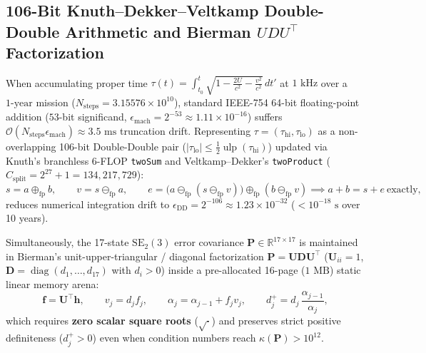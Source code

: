 \documentclass[11pt,a4paper]{article}
\theoremstyle{plain}
\theoremstyle{definition}
\theoremstyle{remark}
\begin{document}
\subsection{106-Bit Knuth--Dekker--Veltkamp Double-Double Arithmetic and Bierman $UDU^\top$ Factorization}

When accumulating proper time $\tau(t) = \int_{t_0}^t \sqrt{1 - \frac{2U}{c^2} - \frac{v^2}{c^2}}\,dt'$ at $1\text{ kHz}$ over a $1\text{-year}$ mission ($N_{\text{steps}} = 3.15576\times 10^{10}$), standard IEEE-754 64-bit floating-point addition ($53$-bit significand, $\epsilon_{\text{mach}} = 2^{-53} \approx 1.11\times 10^{-16}$) suffers $\mathcal{O}(N_{\text{steps}}\epsilon_{\text{mach}}) \approx 3.5\text{ ms}$ truncation drift. Representing $\tau = (\tau_{\text{hi}}, \tau_{\text{lo}})$ as a non-overlapping 106-bit Double-Double pair ($|\tau_{\text{lo}}| \le \frac{1}{2}\operatorname{ulp}(\tau_{\text{hi}})$) updated via Knuth's branchless 6-FLOP \texttt{twoSum} and Veltkamp--Dekker's \texttt{twoProduct} ($C_{\text{split}} = 2^{27}+1 = 134,217,729$):
\begin{equation}\label{eq:knuth_twosum}
  s = a \oplus_{\text{fp}} b, \qquad v = s \ominus_{\text{fp}} a, \qquad e = \bigl(a \ominus_{\text{fp}} (s \ominus_{\text{fp}} v)\bigr) \oplus_{\text{fp}} (b \ominus_{\text{fp}} v) \implies a + b = s + e \ \text{exactly},
\end{equation}
reduces numerical integration drift to $\epsilon_{\text{DD}} = 2^{-106} \approx 1.23\times 10^{-32}$ ($< 10^{-18}\text{ s}$ over 10 years).

Simultaneously, the 17-state $\text{SE}_2(3)$ error covariance $\mathbf{P} \in \mathbb{R}^{17\times 17}$ is maintained in Bierman's unit-upper-triangular / diagonal factorization $\mathbf{P} = \mathbf{U}\mathbf{D}\mathbf{U}^\top$ ($\mathbf{U}_{ii} = 1$, $\mathbf{D} = \operatorname{diag}(d_1,\dots,d_{17})$ with $d_i > 0$) inside a pre-allocated 16-page ($1\text{ MB}$) static linear memory arena:
\begin{equation}\label{eq:bierman_ud}
  \mathbf{f} = \mathbf{U}^\top \mathbf{h}, \qquad v_j = d_j f_j, \qquad \alpha_j = \alpha_{j-1} + f_j v_j, \qquad d_j^+ = d_j\,\frac{\alpha_{j-1}}{\alpha_j},
\end{equation}
which requires \textbf{zero scalar square roots} ($\sqrt{\cdot}$) and preserves strict positive definiteness ($d_j^+ > 0$) even when condition numbers reach $\kappa(\mathbf{P}) > 10^{12}$.
\end{document}
